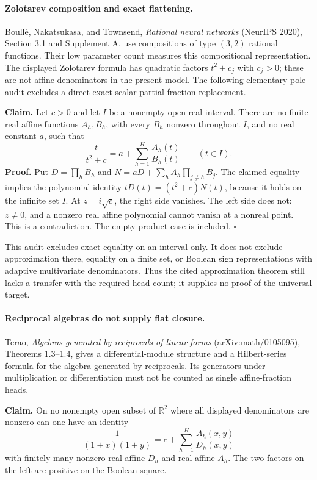 \documentclass[11pt]{article}
\begin{document}
\paragraph{Zolotarev composition and exact flattening.}
Boull\'e, Nakatsukasa, and Townsend, \emph{Rational neural networks}
(NeurIPS 2020), Section 3.1 and Supplement A, use compositions of
type $(3,2)$ rational functions. Their low parameter count measures
this compositional representation. The displayed Zolotarev formula
has quadratic factors $t^2+c_j$ with $c_j>0$; these are not affine
denominators in the present model. The following elementary pole audit
excludes a direct exact scalar partial-fraction replacement.

\textbf{Claim.} Let $c>0$ and let $I$ be a nonempty open real interval.
There are no finite real affine functions $A_h,B_h$, with every $B_h$
nonzero throughout $I$, and no real constant $a$, such that
\[
 \frac{t}{t^2+c}=a+\sum_{h=1}^H\frac{A_h(t)}{B_h(t)}
 \qquad(t\in I).
\]
\textbf{Proof.} Put $D=\prod_h B_h$ and
$N=aD+\sum_h A_h\prod_{j\ne h}B_j$.
The claimed equality implies the polynomial identity
$tD(t)=(t^2+c)N(t)$, because it holds on the infinite set $I$.
At $z=i\sqrt c$, the right side vanishes. The left side does not:
$z\ne0$, and a nonzero real affine polynomial cannot vanish at a
nonreal point. This is a contradiction. The empty-product case is
included. $\square$

This audit excludes exact equality on an interval only. It does not
exclude approximation there, equality on a finite set, or Boolean
sign representations with adaptive multivariate denominators. Thus
the cited approximation theorem still lacks a transfer with the
required head count; it supplies no proof of the universal target.


\paragraph{Reciprocal algebras do not supply flat closure.}
Terao, \emph{Algebras generated by reciprocals of linear forms}
(arXiv:math/0105095), Theorems 1.3--1.4, gives a differential-module
structure and a Hilbert-series formula for the algebra generated by
reciprocals. Its generators under multiplication or differentiation
must not be counted as single affine-fraction heads.

\textbf{Claim.} On no nonempty open subset of $\mathbb R^2$ where
all displayed denominators are nonzero can one have an identity
\[
 \frac1{(1+x)(1+y)}=c+\sum_{h=1}^H\frac{A_h(x,y)}{D_h(x,y)}
\]
with finitely many nonzero real affine $D_h$ and real affine $A_h$.
The two factors on the left are positive on the Boolean square.
\end{document}
